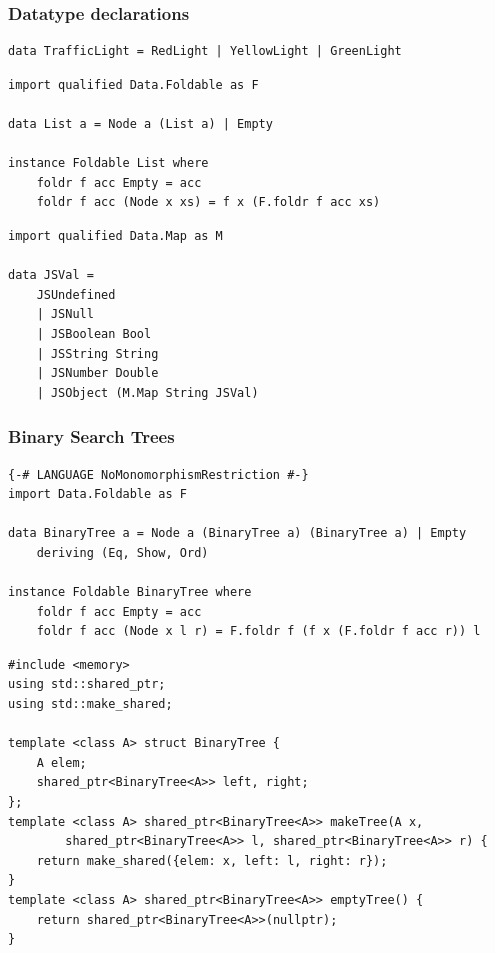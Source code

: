 \documentclass{beamer}
\begin{document}
\begin{frame}[fragile]
\frametitle{Datatype declarations}
\begin{Verbatim}[frame=single, fontsize=\scriptsize]
data TrafficLight = RedLight | YellowLight | GreenLight
\end{Verbatim}
\begin{Verbatim}[frame=single, fontsize=\scriptsize]
import qualified Data.Foldable as F

data List a = Node a (List a) | Empty

instance Foldable List where
    foldr f acc Empty = acc
    foldr f acc (Node x xs) = f x (F.foldr f acc xs)
\end{Verbatim}
\begin{Verbatim}[frame=single, fontsize=\scriptsize]
import qualified Data.Map as M

data JSVal =
    JSUndefined
    | JSNull
    | JSBoolean Bool
    | JSString String
    | JSNumber Double
    | JSObject (M.Map String JSVal)
\end{Verbatim}
\end{frame}

\begin{frame}[fragile]
\frametitle{Binary Search Trees}
\begin{Verbatim}[frame=single, fontsize=\scriptsize]
{-# LANGUAGE NoMonomorphismRestriction #-}
import Data.Foldable as F

data BinaryTree a = Node a (BinaryTree a) (BinaryTree a) | Empty
    deriving (Eq, Show, Ord)

instance Foldable BinaryTree where
    foldr f acc Empty = acc
    foldr f acc (Node x l r) = F.foldr f (f x (F.foldr f acc r)) l
\end{Verbatim}
\begin{Verbatim}[frame=single, fontsize=\scriptsize]
#include <memory>
using std::shared_ptr;
using std::make_shared;

template <class A> struct BinaryTree {
    A elem;
    shared_ptr<BinaryTree<A>> left, right;
};
template <class A> shared_ptr<BinaryTree<A>> makeTree(A x,
        shared_ptr<BinaryTree<A>> l, shared_ptr<BinaryTree<A>> r) {
    return make_shared({elem: x, left: l, right: r});
}
template <class A> shared_ptr<BinaryTree<A>> emptyTree() {
    return shared_ptr<BinaryTree<A>>(nullptr);
}
\end{Verbatim}
\end{frame}
\end{document}
